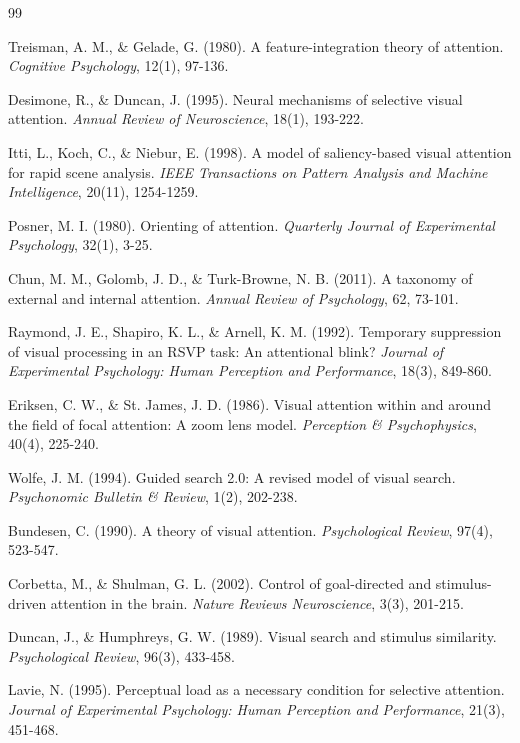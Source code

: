 \documentclass[a4paper, 11pt]{article}
\begin{document}
\begin{thebibliography}{99}

Treisman, A. M., \& Gelade, G. (1980). A feature-integration theory of attention. \textit{Cognitive Psychology}, 12(1), 97-136.

Desimone, R., \& Duncan, J. (1995). Neural mechanisms of selective visual attention. \textit{Annual Review of Neuroscience}, 18(1), 193-222.

Itti, L., Koch, C., \& Niebur, E. (1998). A model of saliency-based visual attention for rapid scene analysis. \textit{IEEE Transactions on Pattern Analysis and Machine Intelligence}, 20(11), 1254-1259.

Posner, M. I. (1980). Orienting of attention. \textit{Quarterly Journal of Experimental Psychology}, 32(1), 3-25.

Chun, M. M., Golomb, J. D., \& Turk-Browne, N. B. (2011). A taxonomy of external and internal attention. \textit{Annual Review of Psychology}, 62, 73-101.

Raymond, J. E., Shapiro, K. L., \& Arnell, K. M. (1992). Temporary suppression of visual processing in an RSVP task: An attentional blink? \textit{Journal of Experimental Psychology: Human Perception and Performance}, 18(3), 849-860.

Eriksen, C. W., \& St. James, J. D. (1986). Visual attention within and around the field of focal attention: A zoom lens model. \textit{Perception \& Psychophysics}, 40(4), 225-240.

Wolfe, J. M. (1994). Guided search 2.0: A revised model of visual search. \textit{Psychonomic Bulletin \& Review}, 1(2), 202-238.

Bundesen, C. (1990). A theory of visual attention. \textit{Psychological Review}, 97(4), 523-547.

Corbetta, M., \& Shulman, G. L. (2002). Control of goal-directed and stimulus-driven attention in the brain. \textit{Nature Reviews Neuroscience}, 3(3), 201-215.

Duncan, J., \& Humphreys, G. W. (1989). Visual search and stimulus similarity. \textit{Psychological Review}, 96(3), 433-458.

Lavie, N. (1995). Perceptual load as a necessary condition for selective attention. \textit{Journal of Experimental Psychology: Human Perception and Performance}, 21(3), 451-468.


\end{thebibliography}
\end{document}
